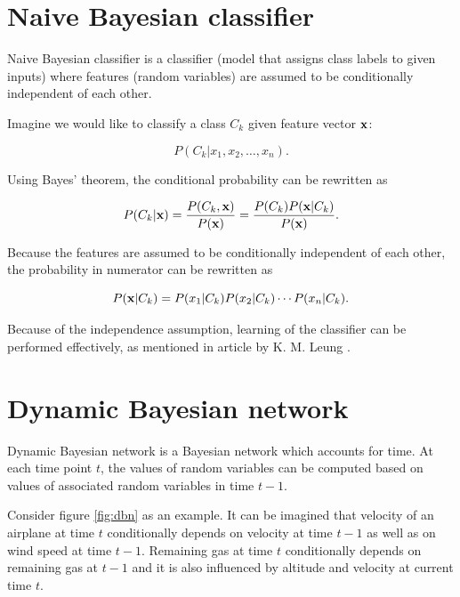 \documentclass[thesis=B,english]{FITthesis}[2012/06/26]
\begin{document}
\section{Naive Bayesian classifier}

Naive Bayesian classifier is a classifier (model that assigns class labels to given inputs) where features (random variables) are assumed to be conditionally independent of each other.

Imagine we would like to classify a class $C_k$ given feature vector $\textbf x$:

\begin{equation*}
P(C_k | x_1, x_2, \dots, x_n).
\end{equation*}

Using Bayes' theorem, the conditional probability can be rewritten as

\begin{equation*}
P(C_k | \textbf x) = \frac{P(C_k,\textbf x)}{P(\textbf x)} = \frac{P(C_k) P(\textbf x | C_k)}{P(\textbf x)}.
\end{equation*}

Because the features are assumed to be conditionally independent of each other, the probability in numerator can be rewritten as

\begin{equation*}
P(\textbf x | C_k) = P(x_1|C_k) P(x_2|C_k) \cdots P(x_n|C_k).
\end{equation*}

Because of the independence assumption, learning of the classifier can be performed effectively, as mentioned in article by K. M. Leung \cite{naive-bayesian-classifier}.

\section{Dynamic Bayesian network}

Dynamic Bayesian network is a Bayesian network which accounts for time. At each time point $t$, the values of random variables can be computed based on values of associated random variables in time $t-1$.

Consider figure \ref{fig:dbn} as an example. It can be imagined that velocity of an airplane at time $t$ conditionally depends on velocity at time $t-1$ as well as on wind speed at time $t-1$. Remaining gas at time $t$ conditionally depends on remaining gas at $t-1$ and it is also influenced by altitude and velocity at current time $t$.
\end{document}
